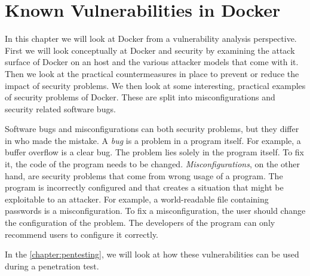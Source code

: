 \chapter{Known Vulnerabilities in Docker}\label{chapter:vulnerabilities}
In this chapter we will look at Docker from a vulnerability analysis perspective. First we will look conceptually at Docker and security by examining the attack surface of Docker on an host and the various attacker models that come with it. Then we look at the practical countermeasures in place to prevent or reduce the impact of security problems. We then look at some interesting, practical examples of security problems of Docker. These are split into misconfigurations and security related software bugs.

\hfill

Software bugs and misconfigurations can both security problems, but they differ in who made the mistake. A \emph{bug} is a problem in a program itself. For example, a buffer overflow is a clear bug. The problem lies solely in the program itself. To fix it, the code of the program needs to be changed. \emph{Misconfigurations}, on the other hand, are security problems that come from wrong usage of a program. The program is incorrectly configured and that creates a situation that might be exploitable to an attacker. For example, a world-readable file containing passwords is a misconfiguration. To fix a misconfiguration, the user should change the configuration of the problem. The developers of the program can only recommend users to configure it correctly.

\hfill

In the \autoref{chapter:pentesting}, we will look at how these vulnerabilities can be used during a penetration test.





